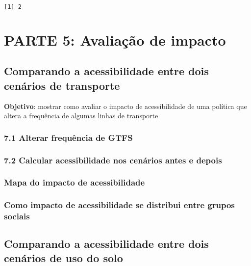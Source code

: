 \documentclass[
  letterpaper,
  DIV=11,
  numbers=noendperiod]{scrreprt}
\begin{document}
\begin{verbatim}
[1] 2
\end{verbatim}

\part{PARTE 5: Avaliação de impacto}

\hypertarget{comparando-a-acessibilidade-entre-dois-cenuxe1rios-de-transporte}{%
\chapter{Comparando a acessibilidade entre dois cenários de
transporte}\label{comparando-a-acessibilidade-entre-dois-cenuxe1rios-de-transporte}}

\textbf{Objetivo}: mostrar como avaliar o impacto de acessibilidade de
uma política que altera a frequência de algumas linhas de transporte

\hypertarget{alterar-frequuxeancia-de-gtfs}{%
\section{7.1 Alterar frequência de
GTFS}\label{alterar-frequuxeancia-de-gtfs}}

\hypertarget{calcular-acessibilidade-nos-cenuxe1rios-antes-e-depois}{%
\section{7.2 Calcular acessibilidade nos cenários antes e
depois}\label{calcular-acessibilidade-nos-cenuxe1rios-antes-e-depois}}

\hypertarget{mapa-do-impacto-de-acessibilidade}{%
\section{Mapa do impacto de
acessibilidade}\label{mapa-do-impacto-de-acessibilidade}}

\hypertarget{como-impacto-de-acessibilidade-se-distribui-entre-grupos-sociais}{%
\section{Como impacto de acessibilidade se distribui entre grupos
sociais}\label{como-impacto-de-acessibilidade-se-distribui-entre-grupos-sociais}}

\hypertarget{comparando-a-acessibilidade-entre-dois-cenuxe1rios-de-uso-do-solo}{%
\chapter{Comparando a acessibilidade entre dois cenários de uso do
solo}\label{comparando-a-acessibilidade-entre-dois-cenuxe1rios-de-uso-do-solo}}
\end{document}
